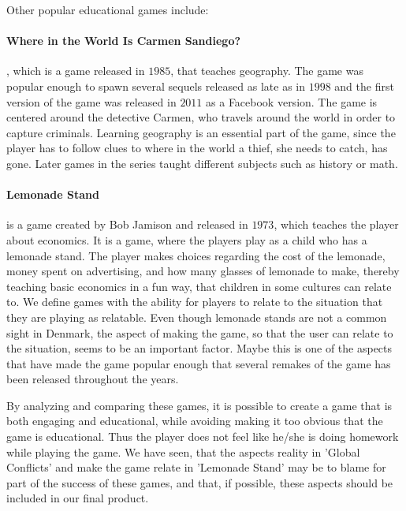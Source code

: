 Other popular educational games include:

\paragraph{Where in the World Is Carmen Sandiego?}, which is a game released in $1985$, that teaches geography.
The game was popular enough to spawn several sequels released as late as in $1998$ and the first version of the game was released in $2011$ as a Facebook version.\cite{carmensandiego}
The game is centered around the detective Carmen, who travels around the world in order to capture criminals.
Learning geography is an essential part of the game, since the player has to follow clues to where in the world a thief, she needs to catch, has gone. Later games in the series taught different subjects such as history or math.

\paragraph{Lemonade Stand} is a game created by Bob Jamison and released in $1973$, which teaches the player about economics.\cite{lemonadestand}
It is a game, where the players play as a child who has a lemonade stand.
The player makes choices regarding the cost of the lemonade, money spent on advertising, and how many glasses of lemonade to make, thereby teaching basic economics in a fun way, that children in some cultures can relate to.
We define games with the ability for players to relate to the situation that they are playing as relatable. 
Even though lemonade stands are not a common sight in Denmark, the aspect of making the game, so that the user can relate to the situation, seems to be an important factor.
Maybe this is one of the aspects that have made the game popular enough that several remakes of the game has been released throughout the years.\newline

By analyzing and comparing these games, it is possible to create a game that is both engaging and educational, while avoiding making it too obvious that the game is educational.
Thus the player does not feel like he/she is doing homework while playing the game.
We have seen, that the aspects reality in 'Global Conflicts' and make the game relate in 'Lemonade Stand' may be to blame for part of the success of these games, and that, if possible, these aspects should be included in our final product.

